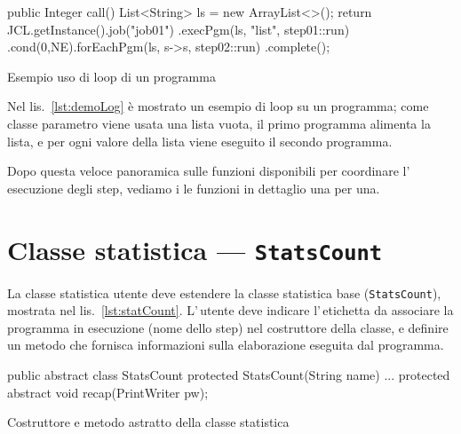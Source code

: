 \begin{elisting}[!htb]
    \begin{javacode}
        public Integer call() {
    List<String> ls = new ArrayList<>();
    return JCL.getInstance().job("job01")
        .execPgm(ls, "list", step01::run)
        .cond(0,NE).forEachPgm(ls, s->s, step02::run)
        .complete();
}
    \end{javacode}
    \caption{Esempio uso di loop di un programma}
    \label{lst:demoLoop}
\end{elisting}
Nel lis.~\ref{lst:demoLog} è mostrato un esempio di loop su un programma; come
classe parametro viene usata una lista vuota, il primo programma alimenta la
lista, e per ogni valore della lista viene eseguito il secondo programma.

Dopo questa veloce panoramica sulle funzioni disponibili per coordinare
l'\,esecuzione degli step, vediamo i le funzioni in dettaglio una per una.


\section{Classe statistica --- \texttt{StatsCount}}\label{sec:statCount}
La classe statistica utente deve estendere la classe statistica base
(\texttt{StatsCount}), mostrata nel lis.~\ref{lst:statCount}.
L'\,utente deve indicare l'\,etichetta da associare la programma in esecuzione
(nome dello step) nel costruttore della classe, e definire un metodo che
fornisca informazioni sulla elaborazione eseguita dal programma.

\begin{elisting}[!htb]
    \begin{javacode}
        public abstract class StatsCount {
    protected StatsCount(String name) { ... }
    protected abstract void recap(PrintWriter pw);
}
    \end{javacode}
    \caption{Costruttore e metodo astratto della classe statistica}
    \label{lst:statCount}
\end{elisting}


